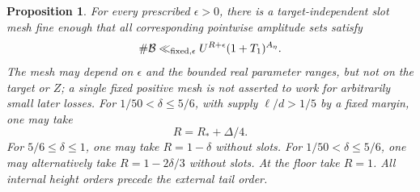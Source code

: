 \documentclass[12pt]{article}
\newtheorem{proposition}[theorem]{Proposition}
\begin{document}
\begin{proposition}\label{prop:counts}
For every prescribed \(\epsilon>0\), there is a target-independent
slot mesh fine enough that all corresponding pointwise amplitude sets satisfy
\[
 \#\mathcal B\ll_{\rm fixed,\epsilon}
 U^{R+\epsilon}(1+T_1)^{A_\eta}.
\]
The mesh may depend on \(\epsilon\) and the bounded real parameter
ranges, but not on the target or \(Z\); a single fixed positive mesh
is not asserted to work for arbitrarily small later losses.
For \(1/50<\delta\le5/6\), with supply \(\ell/d>1/5\)
by a fixed margin, one may take
\[
 R=R_*+\Delta/4.
\]
For \(5/6\le\delta\le1\), one may take \(R=1-\delta\)
without slots.  For \(1/50<\delta\le5/6\), one may alternatively
take \(R=1-2\delta/3\) without slots.  At the floor take \(R=1\).
All internal height orders precede the external tail order.
\end{proposition}
\end{document}
